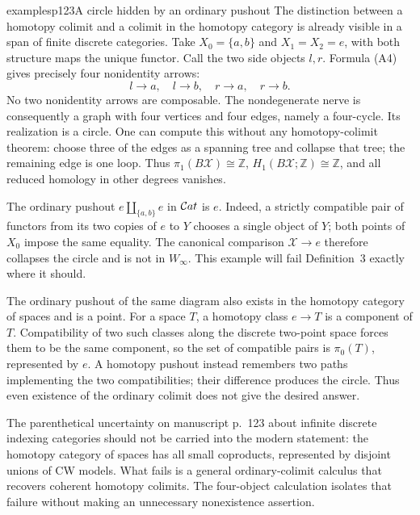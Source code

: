 \begin{dcomment}{examples}{p123}{A circle hidden by an ordinary pushout}
The distinction between a homotopy colimit and a colimit in the homotopy category is already visible in a span of finite discrete categories.  Take $X_0=\{a,b\}$ and $X_1=X_2=e$, with both structure maps the unique functor.  Call the two side objects $l,r$.  Formula (A4) gives precisely four nonidentity arrows:
\[
 l\to a,\quad l\to b,\quad r\to a,\quad r\to b.
\]
No two nonidentity arrows are composable.  The nondegenerate nerve is consequently a graph with four vertices and four edges, namely a four-cycle.  Its realization is a circle.  One can compute this without any homotopy-colimit theorem: choose three of the edges as a spanning tree and collapse that tree; the remaining edge is one loop.  Thus $\pi_1(B\mathcal X)\cong\mathbb Z$, $H_1(B\mathcal X;\mathbb Z)\cong\mathbb Z$, and all reduced homology in other degrees vanishes.

The ordinary pushout $e\amalg_{\{a,b\}}e$ in $\mathcal{C}at$ is $e$.  Indeed, a strictly compatible pair of functors from its two copies of $e$ to $Y$ chooses a single object of $Y$; both points of $X_0$ impose the same equality.  The canonical comparison $\mathcal X\to e$ therefore collapses the circle and is not in $W_\infty$.  This example will fail Definition~3 exactly where it should.

The ordinary pushout of the same diagram also exists in the homotopy category of spaces and is a point.  For a space $T$, a homotopy class $e\to T$ is a component of $T$.  Compatibility of two such classes along the discrete two-point space forces them to be the same component, so the set of compatible pairs is $\pi_0(T)$, represented by $e$.  A homotopy pushout instead remembers two paths implementing the two compatibilities; their difference produces the circle.  Thus even existence of the ordinary colimit does not give the desired answer.

The parenthetical uncertainty on manuscript p.~123 about infinite discrete indexing categories should not be carried into the modern statement: the homotopy category of spaces has all small coproducts, represented by disjoint unions of CW models.  What fails is a general ordinary-colimit calculus that recovers coherent homotopy colimits.  The four-object calculation isolates that failure without making an unnecessary nonexistence assertion.
\end{dcomment}



